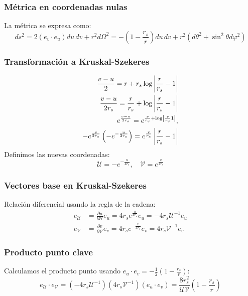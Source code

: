\subsubsection{Métrica en coordenadas nulas}
La métrica se expresa como:
\begin{equation}
    ds^2 = 2(e_v \cdot e_u) du\, dv + r^2 d\Omega^2 = -\left(1-\frac{r_s}{r}\right) du\, dv + r^2(d\theta^2 + \sin^2\theta d\varphi^2)
\end{equation}

\subsubsection{Transformación a Kruskal-Szekeres}

\begin{equation}
    \begin{aligned}
        \frac{v-u}{2}=r+r_s \log \left|\frac{r}{r_s}-1\right|                 \\
        \frac{v-u}{2 r_s}=\frac{r}{r_s}+\log \left|\frac{r}{r_s}-1\right|     \\
        e^{\frac{v-u}{2 r_s}}=e^{\frac{r}{r_s}+\log \left|  \frac{r}{r_s} 1 \right| }, \\
        -e^{\frac{v}{2 r_s}}\left(-e^{-\frac{u}{2 r_s}}\right)=e^{\frac{r}{r_s}}\left|\frac{r}{r_s}-1\right|
    \end{aligned}
\end{equation}
Definimos las nuevas coordenadas:
\begin{equation}
    \mathcal{U} = -e^{-\frac{u}{4r_s}}, \quad \mathcal{V} = e^{\frac{v}{4r_s}}
\end{equation}

\subsubsection{Vectores base en Kruskal-Szekeres}
Relación diferencial usando la regla de la cadena:
\begin{equation}
    \begin{aligned}
        e_\mathcal{U} & = \frac{\partial u}{\partial \mathcal{U}} e_u = 4r_s e^{\frac{u}{4r_s}} e_u = -4r_s \mathcal{U}^{-1} e_u \\
        e_\mathcal{V} & = \frac{\partial v}{\partial \mathcal{V}} e_v = 4r_s e^{-\frac{v}{4r_s}} e_v = 4r_s \mathcal{V}^{-1} e_v
    \end{aligned}
\end{equation}

\subsubsection{Producto punto clave}
Calculamos el producto punto usando \( e_u \cdot e_v = -\frac{1}{2}\left(1-\frac{r_s}{r}\right) \):
\begin{equation}
    e_\mathcal{U} \cdot e_\mathcal{V} = (-4r_s \mathcal{U}^{-1})(4r_s \mathcal{V}^{-1})(e_u \cdot e_v) = \frac{8r_s^2}{\mathcal{U}\mathcal{V}}\left(1-\frac{r_s}{r}\right)
\end{equation}

